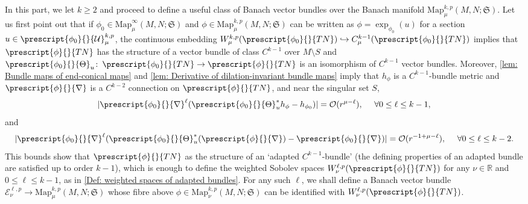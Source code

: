 \documentclass{article}
\numberwithin{equation}{section}        %
\theoremstyle{bfnote}
\theoremstyle{definition}
\theoremstyle{bfremark}
\newcommand{\col}{\colon \thinspace}        %
\newcommand{\R}{\mathbb{R}}                 %
\newcommand{\Map}{\mathrm{Map}}             %
\begin{document}
In this part, we let $k \geq 2$ and proceed to define a useful class of Banach vector bundles over the Banach manifold $\Map^{k,p}_\mu(M,N;\mathfrak{S})$. Let us first point out that if $\phi_0 \in \Map^\infty_\mu(M,N;\mathfrak{S})$ and $\phi \in \Map^{k,p}_\mu(M,N;\mathfrak{S})$ can be written as $\phi = \exp_{\phi_0}(u)$ for a section $u \in \prescript{\phi_0}{}{\mathcal{U}}^{k,p}_\mu$, the continuous embedding $W^{k,p}_\mu(\prescript{\phi_0}{}{TN}) \hookrightarrow C^{k-1}_\mu(\prescript{\phi_0}{}{TN})$ implies that $\prescript{\phi}{}{TN}$ has the structure of a vector bundle of class $C^{k-1}$ over $M \setminus S$ and $\prescript{\phi_0}{}{\Theta}_u \col \prescript{\phi_0}{}{TN} \to \prescript{\phi}{}{TN}$ is an isomorphism of $C^{k-1}$ vector bundles. Moreover, \cref{lem: Bundle maps of end-conical maps} and \cref{lem: Derivative of dilation-invariant bundle maps} imply that $h_\phi$ is a $C^{k-1}$-bundle metric and $\prescript{\phi}{}{\nabla}$ is a $C^{k-2}$ connection on $\prescript{\phi}{}{TN}$, and near the singular set $S$,
\begin{equation*}
    |\prescript{\phi_0}{}{\nabla}^\ell(\prescript{\phi_0}{}{\Theta}_u^* h_\phi - h_{\phi_0})| = \mathcal{O}(r^{\mu-\ell}), ~~~~ \forall 0 \leq \ell \leq k-1,
\end{equation*}
and
\begin{equation*}
    |\prescript{\phi_0}{}{\nabla}^\ell(\prescript{\phi_0}{}{\Theta}_u^* (\prescript{\phi}{}{\nabla}) - \prescript{\phi_0}{}{\nabla})| = \mathcal{O}(r^{-1+\mu-\ell}), ~~~~ \forall 0 \leq \ell \leq k-2 .
\end{equation*}
This bounds show that $\prescript{\phi}{}{TN}$ as the structure of an `adapted $C^{k-1}$-bundle' (the defining properties of an adapted bundle are satisfied up to order $k-1$), which is enough to define the weighted Sobolev spaces $W^{\ell,p}_\nu(\prescript{\phi}{}{TN})$ for any $\nu \in \R$ and $0 \leq \ell \leq k-1$, as in \cref{Def: weighted spaces of adapted bundles}. For any such $\ell$, we shall define a Banach vector bundle $\mathcal{E}^{\ell,p}_\nu \to \Map^{k,p}_\mu(M,N;\mathfrak{S})$ whose fibre above $\phi \in \Map^{k,p}_\nu(M,N;\mathfrak{S})$ can be identified with $W^{\ell,p}_\nu(\prescript{\phi}{}{TN})$.
\end{document}
